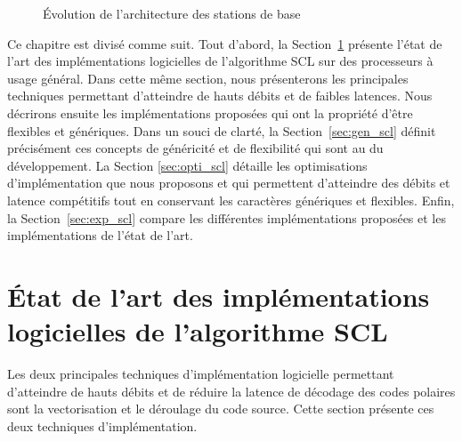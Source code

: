 \begin{figure}[ht]
{  \label{fig:bbu}
  }
  \quad\quad
  \caption{\'Evolution de l'architecture des stations de base}
  \label{fig:bs_evo}
\end{figure}

Ce chapitre est divisé comme suit. Tout d'abord, la Section~\ref{sec:art_scl} présente l'état de l'art des implémentations logicielles de l'algorithme SCL sur des processeurs à usage général. Dans cette même section, nous présenterons les principales techniques permettant d'atteindre de hauts débits et de faibles latences. 
Nous décrirons ensuite les implémentations proposées qui ont la propriété d'être flexibles et génériques. Dans un souci de clarté, la Section~\ref{sec:gen_scl} définit précisément ces concepts de généricité et de flexibilité qui sont au \coeur du développement. La Section \ref{sec:opti_scl} détaille les optimisations d'implémentation que nous proposons et qui permettent d'atteindre des débits et latence compétitifs tout en conservant les caractères génériques et flexibles. Enfin, la Section~\ref{sec:exp_scl} compare les différentes implémentations proposées et les implémentations de l'état de l'art.

\section{\'Etat de l'art des implémentations logicielles de l'algorithme SCL}
\label{sec:art_scl}
Les deux principales techniques d'implémentation logicielle permettant d'atteindre de hauts débits et de réduire la latence de décodage des codes polaires sont la vectorisation et le déroulage du code source. Cette section présente ces deux techniques d'implémentation.

